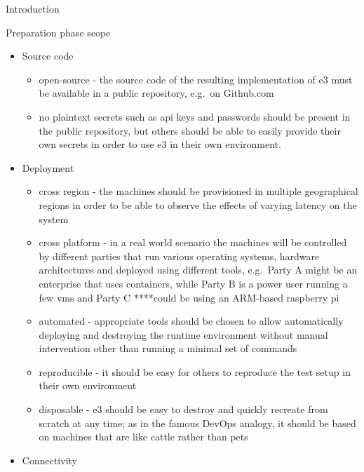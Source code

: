 \begin{frame}{Introduction}
\begin{block}{Preparation phase scope}
\begin{itemize}
  \begin{itemize}
  \tightlist
  \item
    simple - given the limited time of the preparation phase, \gls{e3}
    must focus on simplicity, e.g.~the easiest to implement connectivity
    approach should be chosen
  \item
    extensible - \gls{e3} must allow for switching the building blocks
    during the next phase of the project, e.g.~it should be easy to
    experiment with different connectivity approaches in order to
    measure and compare their characteristics
  \end{itemize}
\item
  Source code

  \begin{itemize}
  \tightlist
  \item
    open-source - the source code of the resulting implementation of
    \gls{e3} must be available in a public repository, e.g.~on
    Github.com
  \item
    no plaintext secrets such as \gls{api} keys and passwords should be
    present in the public repository, but others should be able to
    easily provide their own secrets in order to use \gls{e3} in their
    own environment.
  \end{itemize}
\item
  Deployment

  \begin{itemize}
  \tightlist
  \item
    cross region - the machines should be provisioned in multiple
    geographical regions in order to be able to observe the effects of
    varying latency on the system
  \item
    cross platform - in a real world scenario the machines will be
    controlled by different parties that run various operating systems,
    hardware architectures and deployed using different tools,
    e.g.~Party A might be an enterprise that uses containers, while
    Party B is a power user running a few \glspl{vm} and Party C
    ****could be using an ARM-based raspberry pi
  \item
    automated - appropriate tools should be chosen to allow
    automatically deploying and destroying the runtime environment
    without manual intervention other than running a minimal set of
    commands
  \item
    reproducible - it should be easy for others to reproduce the test
    setup in their own environment
  \item
    disposable - \gls{e3} should be easy to destroy and quickly recreate
    from scratch at any time; as in the famous DevOps
    analogy\autocite{biasHistoryPetsVs2016}, it should be based on
    machines that are like cattle rather than pets
  \end{itemize}
\item
  Connectivity


\end{itemize}
\end{block}
\end{frame}
